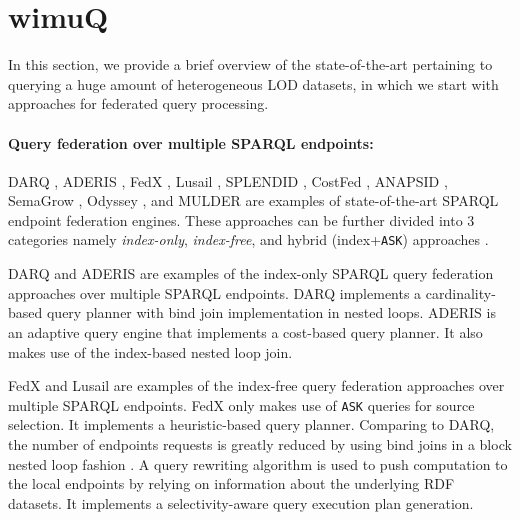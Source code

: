 \section{wimuQ}
In this section, we provide a brief overview of the state-of-the-art pertaining to querying a huge amount of heterogeneous LOD datasets, in which we start with approaches for federated query processing.
\paragraph*{\textbf{Query federation over multiple SPARQL endpoints:}}

DARQ \cite{darq2008}, ADERIS \cite{aderis2011}, FedX \cite{fedx2011}, Lusail \cite{abdelaziz2017lusail}, SPLENDID \cite{splendid2011}, CostFed \cite{saleem2018costfed}, ANAPSID \cite{anapsid2011}, SemaGrow \cite{semagrow2015}, Odyssey \cite{odyssey2017}, and MULDER \cite{endris2018querying} are examples of state-of-the-art SPARQL endpoint federation engines. These approaches can be further divided into 3 categories namely \emph{index-only}, \emph{index-free}, and hybrid (index+\texttt{ASK}) approaches \cite{saleem2015fine}. 

DARQ and ADERIS are examples of the index-only SPARQL query federation approaches over multiple SPARQL endpoints. DARQ implements a cardinality-based query planner with bind join implementation in nested loops. ADERIS is an adaptive query engine that implements a cost-based query planner. It also makes use of the index-based nested loop join. 

FedX and Lusail are examples of the index-free query federation approaches over multiple SPARQL endpoints. 
FedX only makes use of \texttt{ASK} queries for source selection. It implements a heuristic-based query planner. Comparing to DARQ, the number of endpoints requests is greatly reduced by using bind joins in a block nested loop fashion \cite{fedx2011}. A query rewriting algorithm is used to
push computation to the local endpoints by relying on information about the underlying RDF datasets. It implements a selectivity-aware query execution plan generation. 

